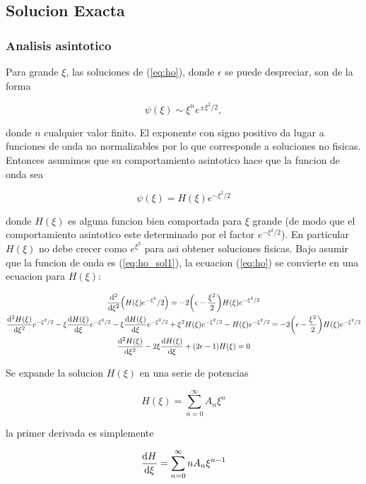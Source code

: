 \documentclass[11pt]{article}
\begin{document}
\subsection{Solucion Exacta}
\label{sec:org1b64bd6}

\subsubsection{Analisis asintotico}
\label{sec:org0d4d4c2}

Para grande \(\xi\), las soluciones de (\ref{eq:ho}), donde \(\epsilon\) se puede despreciar, son de la forma

\[ \psi(\xi) \sim \xi^n e^{\pm \xi^2/2}, \]

donde \(n\) cualquier valor finito. El exponente con signo positivo da lugar a funciones de onda no normalizables por lo que corresponde a soluciones no fisicas. Entonces asumimos que su comportamiento asintotico hace que la funcion de onda sea

\begin{equation}
\label{eq:ho_sol1}
\psi(\xi) = H(\xi)e^{-\xi^2/2}
\end{equation}

donde \(H(\xi)\) es alguna funcion bien comportada para \(\xi\) grande (de modo que el comportamiento asintotico este determinado por el factor \(e^{-\xi^2/2}\)). En particular \(H(\xi)\) no debe crecer como \(e^{\xi^2}\) para asi obtener soluciones fisicas. Bajo asumir que la funcion de onda es (\ref{eq:ho_sol1}), la ecuacion (\ref{eq:ho}) se convierte en una ecuacion para \(H(\xi)\):

\begin{gather*}
    \dv[2]{\xi}(H(\xi)e^{-\xi^2}/2) = -2\qty(\epsilon- \frac{\xi^2}{2})H(\xi)e^{-\xi^2/2} \\
    \dv[2]{H(\xi)}{\xi} e^{-\xi^2/2}  -\xi\dv{H(\xi)}{\xi}e^{-\xi^2/2} - \xi\dv{H(\xi)}{\xi}e^{-\xi^2/2} + \xi^2 H(\xi)e^{-\xi^2/2}- H(\xi) e^{-\xi^2/2} = -2\qty(\epsilon- \frac{\xi^2}{2})H(\xi)e^{-\xi^2/2} \\
    \dv[2]{H(\xi)}{\xi} - 2\xi \dv{H(\xi)}{\xi} + (2\epsilon - 1)H(\xi) = 0
\end{gather*}

Se expande la solucion \(H(\xi)\) en una serie de potencias

\[ H(\xi) = \sum_{n=0}^{\infty} A_n\xi^n \]

la primer derivada es simplemente

\[ \dv{H}{\xi} = \sum_{n=0}^{\infty} nA_n\xi^{n-1} \]
\end{document}
